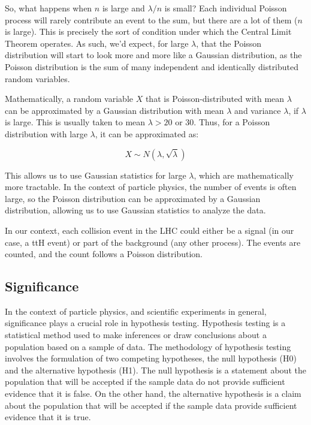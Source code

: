 So, what happens when $n$ is large and $\lambda/n$ is small? Each individual Poisson process will rarely contribute an
event to the sum, but there are a lot of them ($n$ is large). This is precisely the sort of condition under which the
Central Limit Theorem operates. As such, we'd expect, for large $\lambda$, that the Poisson distribution will start to
look more and more like a Gaussian distribution, as the Poisson distribution is the sum of many independent and
identically distributed random variables.

Mathematically, a random variable $X$ that is Poisson-distributed with mean $\lambda$ can be approximated by a Gaussian
distribution with mean $\lambda$ and variance $\lambda$, if $\lambda$ is large. This is usually taken to mean $\lambda >
    20$ or $30$. Thus, for a Poisson distribution with large $\lambda$, it can be approximated as:

\begin{equation}
    X \sim N(\lambda, \sqrt{\lambda})
\end{equation}

This allows us to use Gaussian statistics for large $\lambda$, which are mathematically more tractable. In the context
of particle physics, the number of events is often large, so the Poisson distribution can be approximated by a Gaussian
distribution, allowing us to use Gaussian statistics to analyze the data.

In our context, each collision event in the LHC could either be a signal (in our case, a ttH event) or part of the
background (any other process). The events are counted, and the count follows a Poisson distribution.

\subsection{Significance}

In the context of particle physics, and scientific experiments in general, significance plays a crucial role in
hypothesis testing. Hypothesis testing is a statistical method used to make inferences or draw conclusions about a
population based on a sample of data. The methodology of hypothesis testing involves the formulation of two competing
hypotheses, the null hypothesis (H0) and the alternative hypothesis (H1). The null hypothesis is a statement about the
population that will be accepted if the sample data do not provide sufficient evidence that it is false. On the other
hand, the alternative hypothesis is a claim about the population that will be accepted if the sample data provide
sufficient evidence that it is true.


